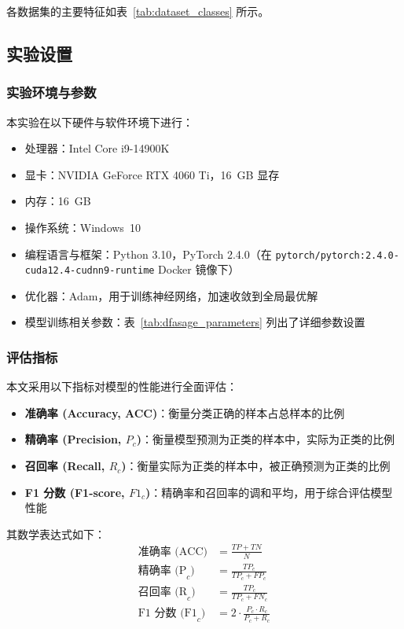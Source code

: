 \documentclass{article}
\begin{document}
各数据集的主要特征如表~\ref{tab:dataset_classes} 所示。

\subsection{实验设置}

\subsubsection{实验环境与参数}
本实验在以下硬件与软件环境下进行：
\begin{itemize}
    \item 处理器：Intel Core i9-14900K
    \item 显卡：NVIDIA GeForce RTX 4060 Ti，16~GB 显存
    \item 内存：16~GB
    \item 操作系统：Windows~10
    \item 编程语言与框架：Python 3.10，PyTorch 2.4.0（在 \texttt{pytorch/pytorch:2.4.0-cuda12.4-cudnn9-runtime} Docker 镜像下）
    \item 优化器：Adam，用于训练神经网络，加速收敛到全局最优解
    \item 模型训练相关参数：表~\ref{tab:dfasage_parameters} 列出了详细参数设置
\end{itemize}

\subsubsection{评估指标}
本文采用以下指标对模型的性能进行全面评估：
\begin{itemize}
    \item \textbf{准确率 (Accuracy, ACC)}：衡量分类正确的样本占总样本的比例
    \item \textbf{精确率 (Precision, $P_c$)}：衡量模型预测为正类的样本中，实际为正类的比例
    \item \textbf{召回率 (Recall, $R_c$)}：衡量实际为正类的样本中，被正确预测为正类的比例
    \item \textbf{F1 分数 (F1-score, $F1_c$)}：精确率和召回率的调和平均，用于综合评估模型性能
\end{itemize}

其数学表达式如下：
\begin{align}
\text{准确率 (ACC)} &= \frac{TP + TN}{N} \label{eq:accuracy} \\
\text{精确率 (P}_c\text{)} &= \frac{TP_c}{TP_c + FP_c} \label{eq:precision} \\
\text{召回率 (R}_c\text{)} &= \frac{TP_c}{TP_c + FN_c} \label{eq:recall} \\
\text{F1 分数 (F1}_c\text{)} &= 2 \cdot \frac{P_c \cdot R_c}{P_c + R_c} \label{eq:f1score}
\end{align}
\end{document}
